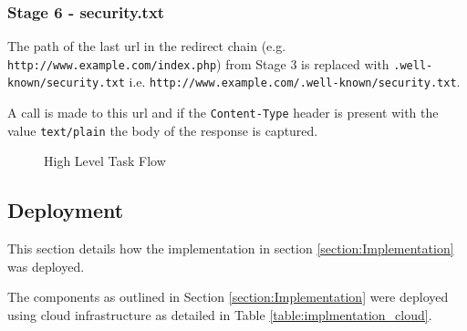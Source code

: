 \documentclass{mscreport}
\begin{document}
\subsubsection{Stage 6 - security.txt}

The path of the last url in the redirect chain (e.g. \texttt{http://www.example.com/index.php}) from Stage 3 is replaced with \texttt{.well-known/security.txt} i.e. \newline \texttt{http://www.example.com/.well-known/security.txt}.

\vspace{0.3cm} \noindent
A call is made to this url and if the \texttt{Content-Type} header is present with the value \texttt{text/plain} the body of the response is captured.


\begin{figure}[p]
	\begin{center}
		\caption{High Level Task Flow}
		\label{fig:task_flow}
	\end{center}
\end{figure}

\clearpage
\newpage

\subsection{Deployment}

This section details how the implementation in section \ref{section:Implementation} was deployed.

\vspace{0.3cm} \noindent
The components as outlined in Section \ref{section:Implementation} were deployed using cloud infrastructure as detailed in Table \ref{table:implmentation_cloud}.
\end{document}
